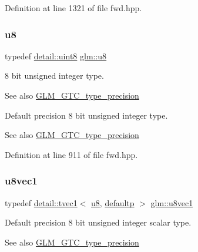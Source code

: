 Definition at line 1321 of file fwd.\+hpp.

\mbox{\label{group__gtc__type__precision_ga5e3dc67373d5068997d2d9f41c9024d2}} 
\subsubsection{\texorpdfstring{u8}{u8}}
{\footnotesize\ttfamily typedef \hyperlink{namespaceglm_1_1detail_aef2588f97d090cc19fbbe0c74fe17c8f}{detail\+::uint8} \hyperlink{group__gtc__type__precision_ga5e3dc67373d5068997d2d9f41c9024d2}{glm\+::u8}}

8 bit unsigned integer type. \begin{DoxySeeAlso}{See also}
\hyperlink{group__gtc__type__precision}{G\+L\+M\+\_\+\+G\+T\+C\+\_\+type\+\_\+precision}
\end{DoxySeeAlso}
Default precision 8 bit unsigned integer type. \begin{DoxySeeAlso}{See also}
\hyperlink{group__gtc__type__precision}{G\+L\+M\+\_\+\+G\+T\+C\+\_\+type\+\_\+precision} 
\end{DoxySeeAlso}


Definition at line 911 of file fwd.\+hpp.

\mbox{\label{group__gtc__type__precision_gaf0155c700da11c0b5518a777d1f0cd23}} 
\subsubsection{\texorpdfstring{u8vec1}{u8vec1}}
{\footnotesize\ttfamily typedef \hyperlink{structglm_1_1detail_1_1tvec1}{detail\+::tvec1}$<$ \hyperlink{group__gtc__type__precision_ga5e3dc67373d5068997d2d9f41c9024d2}{u8}, \hyperlink{namespaceglm_a0f04f086094c747d227af4425893f545a9d21ccd8b5a009ec7eb7677befc3bf51}{defaultp} $>$ \hyperlink{group__gtc__type__precision_gaf0155c700da11c0b5518a777d1f0cd23}{glm\+::u8vec1}}

Default precision 8 bit unsigned integer scalar type. \begin{DoxySeeAlso}{See also}
\hyperlink{group__gtc__type__precision}{G\+L\+M\+\_\+\+G\+T\+C\+\_\+type\+\_\+precision} 
\end{DoxySeeAlso}


